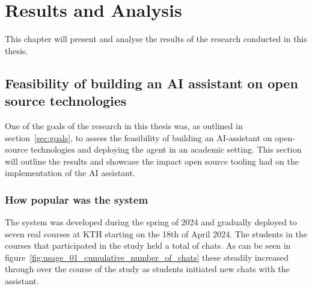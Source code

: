 ﻿\chapter{Results and Analysis}
\label{ch:resultsAndAnalysis}




This chapter will present and analyse the results of the research conducted in this thesis.






\section{Feasibility of building an AI assistant on open source technologies}


One of the goals of the research in this thesis was, as outlined in section~\ref{sec:goals}, to assess the feasibility of building an AI-assistant on open-source technologies and deploying the agent in an academic setting. This section will outline the results and showcase the impact open source tooling had on the implementation of the AI assistant.


\subsection{How popular was the system}


The system was developed during the spring of 2024 and gradually deployed to seven real courses at KTH starting on the 18th of April 2024. The students in the courses that participated in the study held a total of  chats. As can be seen in figure~\ref{fig:usage_01_cumulative_number_of_chats} these steadily increased through over the course of the study as students initiated new chats with the assistant.


